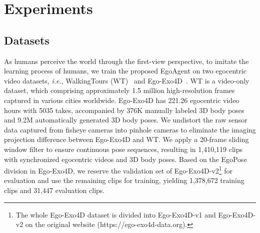 \section{Experiments}
\label{sec:exp}

\subsection{Datasets}
As humans perceive the world through the first-view perspective, to imitate the learning process of humans, we train the proposed EgoAgent on two egocentric video datasets, \emph{i.e.}, WalkingTours (WT)~\cite{venkataramanan2023imagenet} and Ego-Exo4D~\cite{grauman2024ego}. WT is a video-only dataset, which comprising approximately 1.5 million high-resolution frames captured in various cities worldwide. Ego-Exo4D has 221.26 egocentric video hours with 5035 takes, accompanied by 376K manually labeled 3D body poses and 9.2M automatically generated 3D body poses. We undistort the raw sensor data captured from fisheye cameras into pinhole cameras to eliminate the imaging projection difference between Ego-Exo4D and WT. We apply a 20-frame sliding window filter to ensure continuous pose sequences, resulting in 1,410,119 clips with synchronized egocentric videos and 3D body poses. Based on the EgoPose division in Ego-Exo4D, we reserve the validation set of Ego-Exo4D-v2\footnote{The whole Ego-Exo4D dataset is divided into Ego-Exo4D-v1 and Ego-Exo4D-v2 on the original website (https://ego-exo4d-data.org).} for evaluation and use the remaining clips for training, yielding 1,378,672 training clips and 31,447 evaluation clips.


